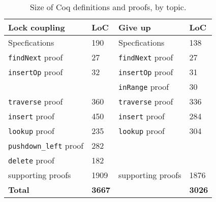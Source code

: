 \documentclass[sigplan,10pt,anonymous,review]{acmart}\settopmatter{printfolios=true,printccs=false,printacmref=false}
\newcommand{\wm}[1]{\textbf{\textcolor{violet}{[William: #1]}}}
\begin{document}
\begin{table}[h]
	\begin{center}
		\begin{tabular}{l | l || l | l } 
			\hline
			\textbf{Lock coupling} & \textbf{LoC} & \textbf{Give up} & \textbf{LoC} \\
			\hline
			Specfications & 190 & Specfications & 138 \\
			\texttt{findNext} proof 	& 27  & \texttt{findNext} proof & 27 \\
			\texttt{insertOp} proof 	& 32  & \texttt{insertOp} proof & 31 \\
			& & \texttt{inRange} proof & 30 \\
			\texttt{traverse} proof	& 360  & \texttt{traverse} proof & 336 \\ 
			\texttt{insert} proof 	   		& 450  & \texttt{insert} proof & 284 \\
			\texttt{lookup} proof 	   	& 235  &  \texttt{lookup} proof & 304 \\ 
			\texttt{pushdown\_left} proof 	   	& 282 & & \\	
			\texttt{delete} proof 		& 182	 &   & 	 \\
			supporting proofs    & 	1909	 & supporting proofs 	& 1876 \\
			\hline
			\textbf{Total} & \textbf{3667} & & \textbf{3026}  
		\end{tabular}
		\caption{Size of Coq definitions and proofs, by topic.}
		\label{table_coq}
	\end{center}
\end{table}

\end{document}
